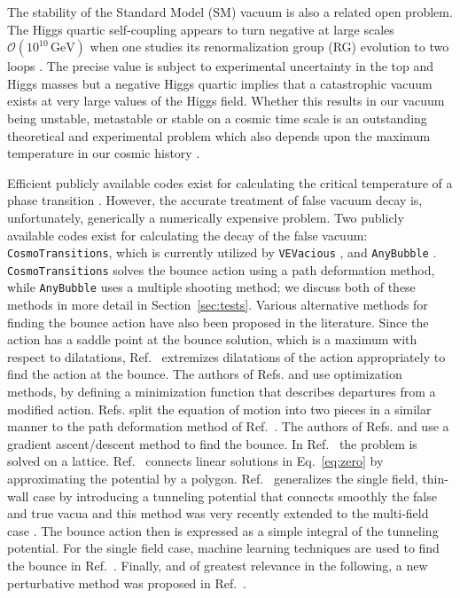 \documentclass[final,3p,11pt,pdflatex]{elsarticle}
\makeatletter
\newcommand{\ab}{\texttt{AnyBubble}\@\xspace}
\newcommand{\cosmo}{\texttt{CosmoTransitions}\@\xspace}
\newcommand{\gev}{\ensuremath{\,\text{GeV}}}
\newcommand{\vevac}{\texttt{VEVacious}\@\xspace}
\newcommand{\secref}[1]{Section~\ref{#1}}
\renewcommand{\refeq}[1]{Eq.~\ref{#1}}
\newcommand{\refcite}[1]{Ref.~\cite{#1}}
\makeatother
\begin{document}
The stability of the Standard Model (SM) vacuum is also a related open problem.
The Higgs quartic self-coupling appears to turn negative at large scales
$\mathcal{O}(10^{10}\gev)$ when one studies its renormalization group (RG)
evolution to two loops \cite{Sher:1988mj,Camargo-Molina:2013sta,Blinov:2013fta,
  Swiezewska:2015paa,Bobrowski:2014dla,Hollik:2016dcm,MOLINA:2014uha}.  The
precise value is subject to experimental uncertainty in the top and Higgs masses
but a negative Higgs quartic implies that a catastrophic vacuum exists at very
large values of the Higgs field.  Whether this results in our vacuum being
unstable, metastable or stable on a cosmic time scale is an outstanding
theoretical and experimental problem \cite{Andreassen:2017rzq} which also
depends upon the maximum temperature in our cosmic history
\cite{Degrassi:2012ry,Rose:2015lna}.

Efficient publicly available codes exist for calculating the critical
temperature of a phase transition \cite{Basler:2018cwe}. However, the
accurate treatment of false vacuum decay is, unfortunately,
generically a numerically expensive problem.  Two publicly available
codes exist for calculating the decay of the false vacuum: \cosmo,
which is currently utilized by \vevac
\cite{Wainwright:2011kj,Camargo-Molina:2013qva}, and \ab
\cite{Masoumi:2016wot}.  \cosmo solves the bounce action using a path
deformation method, while \ab uses a multiple shooting method; we
discuss both of these methods in more detail in \secref{sec:tests}.
Various alternative methods for finding the bounce action have also
been proposed in the literature.  Since the action has a saddle point
at the bounce solution, which is a maximum with respect to
dilatations, \refcite{Claudson:1983et} extremizes dilatations of the
action appropriately to find the action at the bounce.  The authors of
Refs. \cite{Kusenko:1995jv, Kusenko:1996jn, Moreno:1998bq} and
\cite{John:1998ip} use optimization methods, by defining a
minimization function that describes departures from a modified
action.  Refs. \cite{Cline:1999wi, Dasgupta:1996qu} split the equation
of motion into two pieces in a similar manner to the path deformation
method of \refcite{Wainwright:2011kj}.  The authors of
Refs. \cite{Cline:1999wi} and \cite{Cline:1998rc} use a gradient
ascent/descent method to find the bounce.  In
\refcite{Konstandin:2006nd} the problem is solved on a lattice.
\refcite{Guada:2018jek} connects linear solutions in \refeq{eq:zero}
by approximating the potential by a polygon.
\refcite{Espinosa:2018hue} generalizes the single field, thin-wall
case by introducing a tunneling potential that connects smoothly the
false and true vacua and this method was very recently extended to the
multi-field case \cite{Espinosa:2018szu}.  The bounce action then is
expressed as a simple integral of the tunneling potential.  For the
single field case, machine learning techniques are used to find the
bounce in \refcite{Jinno:2018jov}.  Finally, and of greatest relevance
in the following, a new perturbative method was proposed in
\refcite{Akula:2016gpl}.
\end{document}
